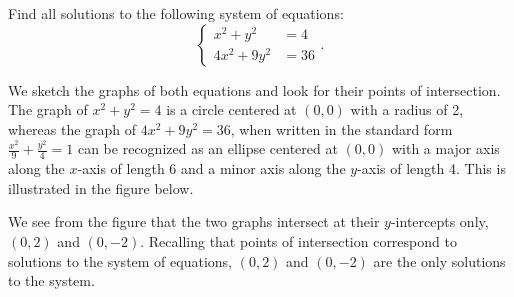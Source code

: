 \documentclass[nooutcomes]{ximera}
\begin{document}
\begin{example}
Find all solutions to the following system of equations:
$$
\begin{cases}
x^2 + y^2 & =  4 \\
4x^2 + 9y^2 & = 36
\end{cases}.
$$
\end{example}
\begin{explanation}
We sketch the graphs of both equations and look for their points of intersection. The graph of $x^2 + y^2 = 4$ is a circle centered at $(0, 0)$ with a radius of 2, whereas the graph of $4x^2 + 9y^2 = 36$, when written in the standard form $\frac{x^2}{9} + \frac{y^2}{4} = 1$ can be recognized as an ellipse centered at $(0, 0)$ with a major axis along the $x$-axis of length 6 and a minor axis along the $y$-axis of length 4. This is illustrated in the figure below.

\begin{image}
\end{image}

We see from the figure that the two graphs intersect at their $y$-intercepts only, $(0, 2)$ and $(0, -2)$. Recalling that points of intersection correspond to solutions to the system of equations, $(0, 2)$ and $(0, -2)$ are the only solutions to the system. 
\end{explanation}
\end{document}
